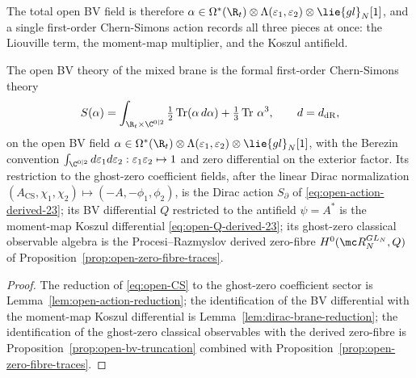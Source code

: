 \documentclass[11pt]{memoir}
\begin{document}
The total open BV field is therefore
\(\alpha\in\Omega^*(\R_t)\otimes
  \Lambda(\varepsilon_1,\varepsilon_2)\otimes\lie{gl}_N[1]\),
and a single first-order Chern-Simons action records all three pieces
at once: the Liouville term, the moment-map multiplier, and the
Koszul antifield.

\begin{prop}\label{prop:open-bv-action-derived}
  The open BV theory of the mixed brane is the formal first-order
  Chern-Simons theory
  \begin{equation}\label{eq:open-CS}
    S(\alpha)=\int_{\R_t\times\C^{0|2}}
      \tfrac12\operatorname{Tr}(\alpha\,d\alpha)
      +\tfrac13\operatorname{Tr}\,\alpha^3,\qquad
    d=d_{\mathrm{dR}},
  \end{equation}
  on the open BV field
  \(\alpha\in\Omega^*(\R_t)\otimes\Lambda(\varepsilon_1,\varepsilon_2)
  \otimes\lie{gl}_N[1]\), with the Berezin convention
  \(\int_{\C^{0|2}}d\varepsilon_1d\varepsilon_2:
    \varepsilon_1\varepsilon_2\mapsto 1\) and zero differential on the
  exterior factor. Its restriction to the ghost-zero coefficient
  fields, after the linear Dirac normalization
  \((A_{\mathrm{CS}},\chi_1,\chi_2)\mapsto(-A,-\phi_1,\phi_2)\), is
  the Dirac action \(S_\partial\) of \eqref{eq:open-action-derived-23};
  its BV differential \(Q\) restricted to the antifield \(\psi=A^\ast\)
  is the moment-map Koszul differential \eqref{eq:open-Q-derived-23};
  its ghost-zero classical observable algebra is the
  Procesi--Razmyslov derived zero-fibre
  \(H^0(\mc R_N^{GL_N},Q)\) of
  Proposition~\ref{prop:open-zero-fibre-traces}.
\end{prop}

\begin{proof}
  The reduction of \eqref{eq:open-CS} to the ghost-zero coefficient
  sector is Lemma~\ref{lem:open-action-reduction}; the
  identification of the BV differential with the moment-map Koszul
  differential is Lemma~\ref{lem:dirac-brane-reduction}; the
  identification of the ghost-zero classical observables with the
  derived zero-fibre is Proposition~\ref{prop:open-bv-truncation}
  combined with Proposition~\ref{prop:open-zero-fibre-traces}.
\end{proof}
\end{document}
